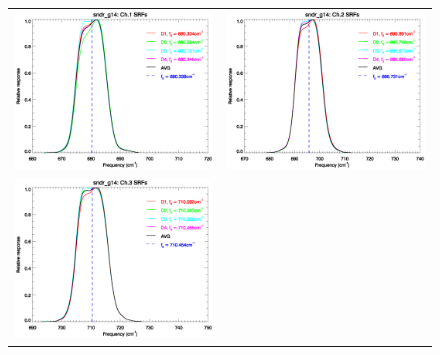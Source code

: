 \begin{figure}[htp]
  \centering
  \begin{tabular}{c c}
    \includegraphics[scale=0.5]{graphics/nominal/sndr_g14.ch1.srf.eps} &
    \includegraphics[scale=0.5]{graphics/nominal/sndr_g14.ch2.srf.eps} \\
    \includegraphics[scale=0.5]{graphics/nominal/sndr_g14.ch3.srf.eps} &

\end{tabular}
\end{figure}
